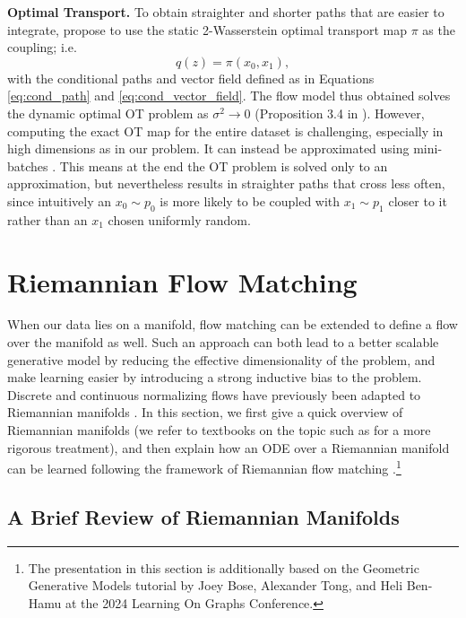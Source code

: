 \textbf{Optimal Transport.} To obtain straighter and shorter paths that are easier to integrate, \citet{tongImprovingGeneralizingFlowbased2023} propose to use the static 2-Wasserstein optimal transport map $\pi$ as the coupling; i.e.
\begin{equation}
    q(z) = \pi(x_0, x_1),
\end{equation}
with the conditional paths and vector field defined as in Equations \ref{eq:cond_path} and \ref{eq:cond_vector_field}. The flow model thus obtained solves the dynamic optimal OT problem as $\sigma^2 \to 0$ (Proposition 3.4 in \citep{tongImprovingGeneralizingFlowbased2023}). However, computing the exact OT map for the entire dataset is challenging, especially in high dimensions as in our problem. It can instead be approximated using mini-batches \citep{fatrasMinibatchOptimalTransport2021}. This means at the end the OT problem is solved only to an approximation, but nevertheless results in straighter paths that cross less often, since intuitively an $x_0 \sim p_0$ is more likely to be coupled with $x_1 \sim p_1$ closer to it rather than an $x_1$ chosen uniformly random.

\section{Riemannian Flow Matching} \label{sec:riemannian_fm}

When our data lies on a manifold, flow matching can be extended to define a flow over the manifold as well. Such an approach can both lead to a better scalable generative model by reducing the effective dimensionality of the problem, and make learning easier by introducing a strong inductive bias to the problem.  Discrete and continuous normalizing flows have previously been adapted to Riemannian manifolds \citep{gemiciNormalizingFlowsRiemannian2016,mathieuRiemannianContinuousNormalizing2020,louNeuralManifoldOrdinary2020}. In this section, we first give a quick overview of Riemannian manifolds (we refer to textbooks on the topic such as \citep{johnm.leeIntroductionRiemannianManifolds2018} for a more rigorous treatment), and then explain how an ODE over a Riemannian manifold can be learned following the framework of Riemannian flow matching \citep{chenRiemannianFlowMatching2023}.\footnote{The presentation in this section is additionally based on the Geometric Generative Models tutorial by Joey Bose, Alexander Tong, and Heli Ben-Hamu at the 2024 Learning On Graphs Conference.} 

\subsection{A Brief Review of Riemannian Manifolds}

